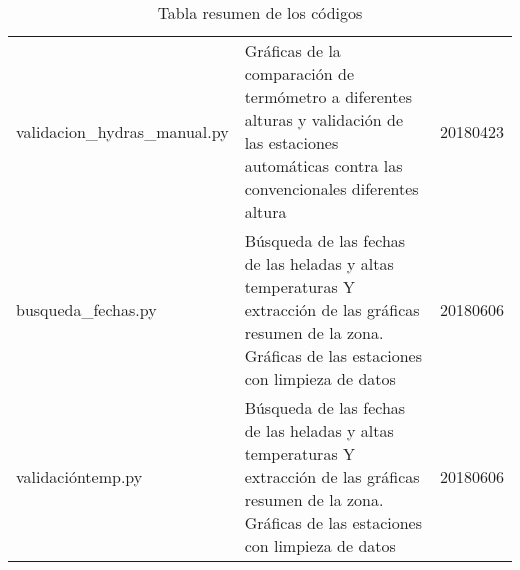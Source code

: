 \documentclass[11pt]{article}
\begin{document}
\begin{landscape}
\begin{table}[ht]
{\begin{tabular}{lll}
validacion\_hydras\_manual.py & Gráficas de la comparación de termómetro a diferentes alturas y validación de las estaciones automáticas contra las convencionales diferentes altura                                  & 20180423 \\
busqueda\_fechas.py & Búsqueda de las fechas de las heladas y altas temperaturas Y extracción de las gráficas resumen de la zona. Gráficas de las estaciones con limpieza de datos & 20180606\\
validacióntemp.py & Búsqueda de las fechas de las heladas y altas temperaturas Y extracción de las gráficas resumen de la zona. Gráficas de las estaciones con limpieza de datos & 20180606
\end{tabular}}
\caption{Tabla resumen de los códigos}
\label{tabla_resumen}
\end{table}



\end{landscape}
\end{document}
